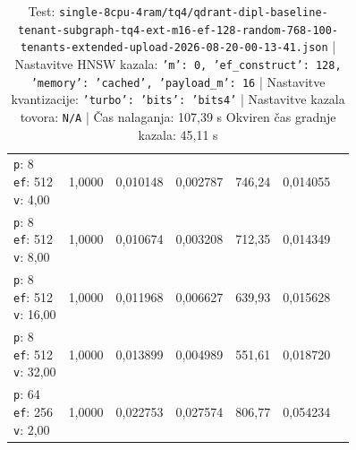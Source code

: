\begin{table}[htbp]
\begin{tabularx}{\textwidth}{Xrrrrrr}
    \makecell{\texttt{p}: 8\\\texttt{ef}: 512\\\texttt{v}: 4,00} & 1,0000 & 0,010148 & 0,002787 & 746,24 & 0,014055 \\
    \makecell{\texttt{p}: 8\\\texttt{ef}: 512\\\texttt{v}: 8,00} & 1,0000 & 0,010674 & 0,003208 & 712,35 & 0,014349 \\
    \makecell{\texttt{p}: 8\\\texttt{ef}: 512\\\texttt{v}: 16,00} & 1,0000 & 0,011968 & 0,006627 & 639,93 & 0,015628 \\
    \makecell{\texttt{p}: 8\\\texttt{ef}: 512\\\texttt{v}: 32,00} & 1,0000 & 0,013899 & 0,004989 & 551,61 & 0,018720 \\
    \makecell{\texttt{p}: 64\\\texttt{ef}: 256\\\texttt{v}: 2,00} & 1,0000 & 0,022753 & 0,027574 & 806,77 & 0,054234 \\
    \bottomrule
  \end{tabularx}
\caption* {Test: \texttt{single-8cpu-4ram/tq4/qdrant-dipl-baseline-tenant-subgraph-tq4-ext-m16-ef-128-random-768-100-tenants-extended-upload-2026-08-20-00-13-41.json} | Nastavitve HNSW kazala: \texttt{{'m': 0, 'ef\_construct': 128, 'memory': 'cached', 'payload\_m': 16}} | Nastavitve kvantizacije: \texttt{{'turbo': {'bits': 'bits4'}}} | Nastavitve kazala tovora: \texttt{N/A} | Čas nalaganja: 107,39 s Okviren čas gradnje kazala: 45,11 s}\end{table}


